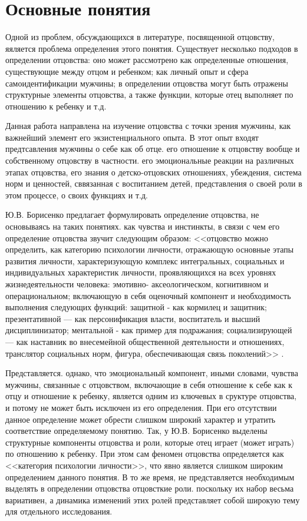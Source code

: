 \documentclass{../../common/thesisbyxetex}
\begin{document}
\section{Основные понятия}

Одной из проблем, обсуждающихся в литературе, посвященной отцовству, яяляется проблема определения
этого понятия. Существует несколько подходов в определении отцовства: оно может рассмотрено как
определенные отношения, существующие между отцом и ребенком; как личный опыт и сфера
самоидентификации мужчины; в определении отцовства могут быть отражены структурные элементы
отцовства, а также функции, которые отец выполняет по отношению к ребенку и т.д.

Данная работа направлена на изучение отцовства с точки зрения мужчины, как важнейший элемент его
экзистенциального опыта. В этот опыт входят предтсавления мужчины о себе как об отце.
его отношение к отцовству вообще и собственному отцовству в частности. его
эмоциональные реакции на различных этапах отцовства, его знания о детско-отцовских
отношениях, убеждения, система норм и ценностей, сввязанная с воспитанием детей,
представления о своей роли в этом процессе, о своих функциях и т.д.

Ю.В. Борисенко предлагает формулировать определение отцовства, не основываясь на таких понятиях.
как чувства и инстинкты, в связи с чем его определение отцовства звучит следующим образом:
<<отцовство можно определить, как категорию психологии
личности, отражающую основные этапы развития личности, характеризующую
комплекс интегральных, социальных и индивидуальных характеристик личности,
проявляющихся на всех уровнях жизнедеятельности человека: эмотивно-
аксеологическом, когнитивном и операциональном; включающую в себя оценочный
компонент и необходимость выполнения следующих функций: защитной - как
кормилец и защитник; презентативной — как персонификация власти, воспитатель
и высший дисциплинизатор; ментальной - как пример для подражания;
социализирующей — как наставник во внесемейной общественной деятельности и
отношениях, транслятор социальных норм, фигура, обеспечивающая связь
поколений>> \cite[48]{psyot}.

Представляется. однако, что эмоциональный компонент, иными словами, чувства мужчины, связанные с
отцовством, включающие в себя отношение к себе как к отцу и отношение к ребенку, является одним из
ключевых в сруктуре отцовства, и потому не может быть исключен из его определения. При его
отсутствии данное определение может обрести слишком широкий характер и утратить соответствие
определяемому понятию. Так, у Ю.В. Борисенко выделены структурные компоненты отцовства и роли,
которые отец играет (может играть) по отношению к ребенку. При этом сам феномен отцовства
определяется как <<категория психологии
личности>>, что явно является слишком широким определением данного понятия. В то же время, не
представляется необходимым выделять в определении отцовства отцовсткие роли. поскольку их набор
весьма вариативен, а динамика изменений этих ролей представляет собой широкую тему для отдельного
исследования.
\end{document}
